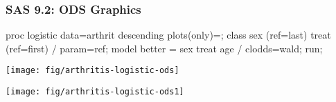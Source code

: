 \begin{frame}[fragile]
\frametitle{SAS 9.2: ODS Graphics}
\begin{Input}[fontsize=\footnotesize,label=\fbox{\texttt{arthritis-logistic-ods.sas}},baselinestretch=0.8]
proc logistic data=arthrit descending 
      plots(only)=;
   class sex (ref=last) treat (ref=first) / param=ref;
   model  better = sex  treat  age / clodds=wald;
	run;
\end{Input}
 \begin{minipage}[b]{.5\linewidth}
  \centering
  \texttt{[image: fig/arthritis-logistic-ods]}
 \end{minipage}%
 \begin{minipage}[b]{.5\linewidth}
  \centering
  \texttt{[image: fig/arthritis-logistic-ods1]}
 \end{minipage}

\end{frame}
